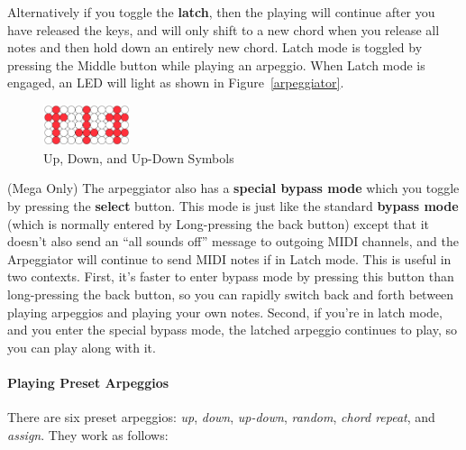 \documentclass{article}
\begin{document}
Alternatively if you toggle the {\bf latch}, then the playing will continue after you have released the keys, and will only shift to a new chord when you release all notes and then hold down an entirely new chord.  Latch mode is toggled by pressing the Middle button while playing an arpeggio.  When Latch mode is engaged, an LED will light as shown in Figure~\ref{arpeggiator}.

\begin{figure}
\begin{center}
\vspace{-2em}\includegraphics[width=1in]{updown}
\vspace{-1em}
\caption{\small Up, Down, and Up-Down Symbols}
\vspace{-2em}
\end{center}
\end{figure}

(Mega Only) The arpeggiator also has a {\bf special bypass mode} which you toggle by pressing the {\bf select} button.  This mode is just like the standard {\bf bypass mode} (which is normally entered by Long-pressing the back button) except that it doesn't also send an ``all sounds off'' message to outgoing MIDI channels, and the Arpeggiator will continue to send MIDI notes if in Latch mode.  This is useful in two contexts.  First, it's faster to enter bypass mode by pressing this button than long-pressing the back button, so you can rapidly switch back and forth between playing arpeggios and playing your own notes.  Second, if you're in latch mode, and you enter the special bypass mode, the latched arpeggio continues to play, so you can play along with it.  

\paragraph{Playing Preset Arpeggios}

There are six preset arpeggios: {\it up}, {\it down}, {\it up-down}, {\it random}, {\it chord repeat}, and {\it assign}.  They work as follows:
\end{document}
